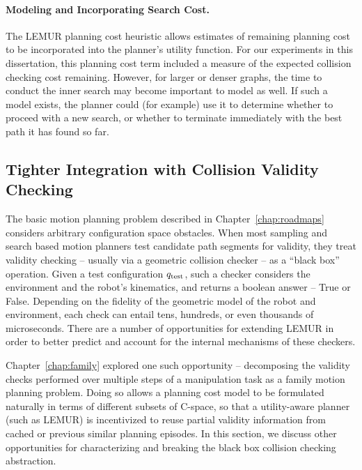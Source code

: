 \paragraph{Modeling and Incorporating Search Cost.}
The LEMUR planning cost heuristic allows estimates of remaining
planning cost to be incorporated into the planner's utility function.
For our experiments in this dissertation,
this planning cost term included a measure of the expected
collision checking cost remaining.
However,
for larger or denser graphs,
the time to conduct the inner search may become important to model
as well.
If such a model exists,
the planner could (for example) use it to determine
whether to proceed with a new search,
or whether to terminate immediately with the best path it has
found so far.

\subsection{Tighter Integration with Collision Validity Checking}

The basic motion planning problem described in Chapter~\ref{chap:roadmaps}
considers arbitrary configuration space obstacles.
When most sampling and search based motion planners test
candidate path segments for validity,
they treat validity checking
-- usually via a geometric collision checker --
as a ``black box'' operation.
Given a test configuration $q_{\mbox{\scriptsize test}}$,
such a checker considers the environment
and the robot's kinematics,
and returns a boolean answer -- True or False.
Depending on the fidelity of the geometric model of the robot
and environment,
each check can entail tens, hundreds, or even thousands
of microseconds.
There are a number of opportunities for extending LEMUR in order
to better predict and account for the internal mechanisms of these
checkers.

Chapter~\ref{chap:family} explored one such opportunity --
decomposing the validity checks performed over multiple steps of
a manipulation task as a family motion planning problem.
Doing so allows a planning cost model to be formulated naturally
in terms of different subsets of C-space,
so that a utility-aware planner (such as LEMUR)
is incentivized to reuse partial validity information
from cached or previous similar planning episodes.
In this section,
we discuss other opportunities for characterizing and breaking
the black box collision checking abstraction.

